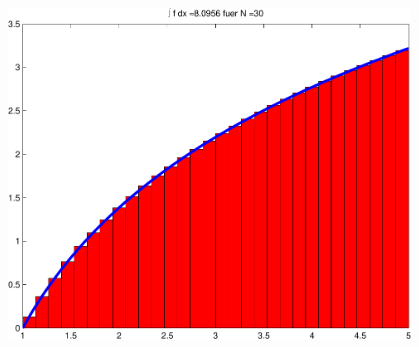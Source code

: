 \documentclass[hyperref={xetex}]{beamer}
\begin{document}
\begin{frame}[fragile]\frametitle{}
\centering\alert{ }\\
\begin{center}\includegraphics[width=0.8\textwidth]{./figures/plot_log}\end{center} 
\end{frame}
\end{document}
